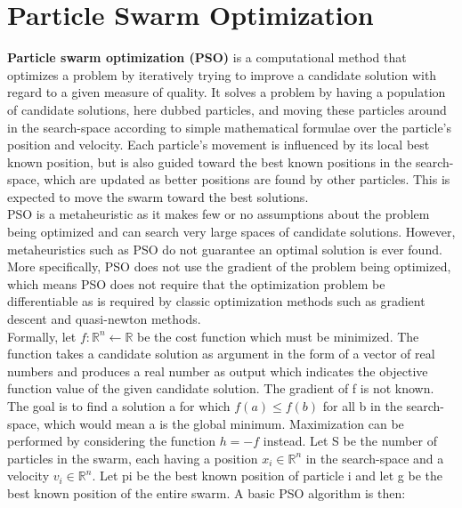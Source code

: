 \documentclass[11pt, a4paper]{report}
\begin{document}
\section{Particle Swarm Optimization}
\textbf{Particle swarm optimization (PSO)} is a computational method that optimizes a problem by iteratively trying to improve a candidate solution with regard to a given measure of quality. It solves a problem by having a population of candidate solutions, here dubbed particles, and moving these particles around in the search-space according to simple mathematical formulae over the particle's position and velocity. Each particle's movement is influenced by its local best known position, but is also guided toward the best known positions in the search-space, which are updated as better positions are found by other particles. This is expected to move the swarm toward the best solutions. \\


PSO is a metaheuristic as it makes few or no assumptions about the problem being optimized and can search very large spaces of candidate solutions. However, metaheuristics such as PSO do not guarantee an optimal solution is ever found. More specifically, PSO does not use the gradient of the problem being optimized, which means PSO does not require that the optimization problem be differentiable as is required by classic optimization methods such as gradient descent and quasi-newton methods. \\

Formally, let $ f: \mathbb{R}^{n} \gets \mathbb{R} $ be the cost function which must be minimized. The function takes a candidate solution as argument in the form of a vector of real numbers and produces a real number as output which indicates the objective function value of the given candidate solution. The gradient of f is not known. The goal is to find a solution a for which $ f(a) \leq f(b) $ for all b in the search-space, which 
would mean a is the global minimum. Maximization can be performed by considering the function $ h = -f $ instead.
Let S be the number of particles in the swarm, each having a position $ x_{i} \in \mathbb{R}^{n} $ in the search-space and a velocity $ v_{i} \in \mathbb{R}^{n} $. Let pi be the best known position of particle i and let g be the best known position of the entire swarm. A basic PSO algorithm is then:

\newpage
\end{document}
